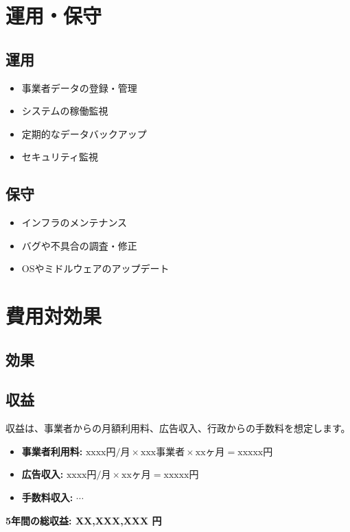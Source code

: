 \documentclass{docs}
\begin{document}
\section{運用・保守}
\subsection{運用}
\begin{itemize}
	\item 事業者データの登録・管理
	\item システムの稼働監視
	\item 定期的なデータバックアップ
	\item セキュリティ監視
\end{itemize}

\subsection{保守}
\begin{itemize}
	\item インフラのメンテナンス
	\item バグや不具合の調査・修正
	\item OSやミドルウェアのアップデート
\end{itemize}

\section{費用対効果}
\subsection{効果}


\subsection{収益}
収益は、事業者からの月額利用料、広告収入、行政からの手数料を想定します。
\begin{itemize}
	\item \textbf{事業者利用料:} $\text{xxxx円/月}\times\text{xxx事業者}\times\text{xxヶ月}=\text{xxxxx円}$
	\item \textbf{広告収入:} $\text{xxxx円/月}\times\text{xxヶ月}=\text{xxxxx円}$
	\item \textbf{手数料収入:} $\cdots$
\end{itemize}
\textbf{5年間の総収益: XX,XXX,XXX 円}
\end{document}
